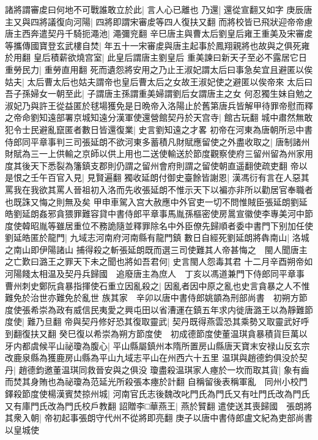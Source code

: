 諸將謂審䖍曰何地不可戰誰敢立於此|{
	言人心已離也}
乃還|{
	還從宣翻又如字}
庚辰唐主又與四將議復向河陽|{
	四將即謂宋審䖍等四人復扶又翻}
而將校皆已飛狀迎帝帝慮唐主西奔遣契丹千騎扼澠池|{
	澠彌兖翻}
辛巳唐主與曹太后劉皇后雍王重美及宋審䖍等攜傳國寶登玄武樓自焚|{
	年五十一宋審䖍與唐主起事於鳳翔親將也故與之俱死雍於用翻}
皇后積薪欲燒宫室|{
	此皇后謂唐主劉皇后}
重美諫曰新天子至必不露居它日重勞民力|{
	重勞直用翻}
死而遺怨將安用之乃止王淑妃謂太后曰事急矣宜且避匿以俟姑夫|{
	太后曹太后也姑夫謂帝也皇后曹太后之女故王淑妃使之避匿以俟帝來}
太后曰吾子孫婦女一朝至此|{
	子謂唐主孫謂重美婦謂劉后女謂唐主之女}
何忍獨生妹自勉之淑妃乃與許王從益匿於毬場獲免是日晩帝入洛陽止於舊第唐兵皆解甲待罪帝慰而釋之帝命劉知遠部署京城知遠分漢軍使還營館契丹於天宫寺|{
	館古玩翻}
城中肅然無敢犯令士民避亂竄匿者數日皆還復業|{
	史言劉知遠之才畧}
初帝在河東為唐朝所忌中書侍郎同平章事判三司張延朗不欲河東多蓄積凡財賦應留使之外盡收取之|{
	唐制諸州財賦為三一上供輸之京師以供上用也二送使輸送於節度觀察使府三留州留為州家用度其後天下悉裂為籓鎮支郡則仍謂之留州會府則謂之留使朝直遥翻使疏吏翻}
帝以是恨之壬午百官入見|{
	見賢遍翻}
獨收延朗付御史臺餘皆謝恩|{
	漢馮衍有言在人惡其罵我在我欲其罵人晉祖初入洛而先收張延朗不惟示天下以褊亦非所以勸居官奉職者也既誅又悔之則無及矣}
甲申車駕入宫大赦應中外官吏一切不問惟賊臣張延朗劉延皓劉延朗姦邪貪猥罪難容貸中書侍郎平章事馬胤孫樞密使房暠宣徽使李專美河中節度使韓昭胤等雖居重位不務詭隨並釋罪除名中外臣僚先歸順者委中書門下别加任使劉延皓匿於龍門|{
	九域志河南府河南縣有龍門鎮}
數日自經死劉延朗將犇南山|{
	洛城之南山即伊陽諸山}
捕得殺之斬張延朗既而選三司使難其人帝甚悔之　閩人聞唐主之亡歎曰潞王之罪天下未之聞也將如吾君何|{
	史言閩人怨毒其君}
十二月辛酉朔帝如河陽餞太相温及契丹兵歸國　追廢唐主為庶人　丁亥以馮道兼門下侍郎同平章事　曹州刺史鄭阮貪暴指揮使石重立因亂殺之|{
	因亂者因中原之亂也史言貪暴之人不惟難免於治世亦難免於亂世}
族其家　辛卯以唐中書侍郎姚顗為刑部尚書　初朔方節度使張希崇為政有威信民夷愛之興屯田以省漕運在鎮五年求内徙唐潞王以為靜難節度使|{
	難乃旦翻}
帝與契丹修好恐其復取靈武|{
	契丹既得燕雲恐其乘勢又取靈武好呼到翻復扶又翻}
癸巳復以希崇為朔方節度使　初成德節度使董温琪貪暴積貨巨萬以牙内都虞候平山祕瓊為腹心|{
	平山縣屬鎮州本隋所置房山縣唐天寶末安禄山反玄宗改鹿泉縣為獲鹿房山縣為平山九域志平山在州西六十五里}
温琪與趙德鈞俱没於契丹|{
	趙德鈞邀董温琪同救晉安與之俱没}
瓊盡殺温琪家人瘞於一坎而取其貨|{
	象有齒而焚其身賄也為祕瓊為范延光所殺張本瘞於計翻}
自稱留後表稱軍亂　同州小校門鐸殺節度使楊漢賓焚掠州城|{
	河南官氏志後魏改叱門氏為門氏又有吐門氏改為門氏又有庫門氏改為門氏校戶教翻}
詔贈李□華燕王|{
	燕於贒翻}
遣使送其喪歸國　張朗將其衆入朝|{
	帝初起事張朗守代州不從將即亮翻}
庚子以唐中書侍郎盧文紀為吏部尚書以皇城使

